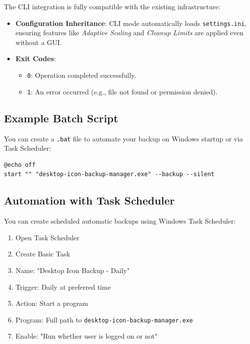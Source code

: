 \documentclass[a4paper,11pt]{article}
\begin{document}
The CLI integration is fully compatible with the existing infrastructure:

\begin{itemize}
  \item \textbf{Configuration Inheritance}: CLI mode automatically
    loads \texttt{settings.ini}, ensuring features like
    \textit{Adaptive Scaling} and \textit{Cleanup Limits} are applied
    even without a GUI.
  \item \textbf{Exit Codes}:
    \begin{itemize}
      \item \texttt{0}: Operation completed successfully.
      \item \texttt{1}: An error occurred (e.g., file not found or
        permission denied).
    \end{itemize}
\end{itemize}

\subsection{Example Batch Script}

You can create a \texttt{.bat} file to automate your backup on
Windows startup or via Task Scheduler:

\begin{verbatim}
@echo off
start "" "desktop-icon-backup-manager.exe" --backup --silent
\end{verbatim}

\subsection{Automation with Task Scheduler}

You can create scheduled automatic backups using Windows Task Scheduler:

\begin{enumerate}
  \item Open Task Scheduler
  \item Create Basic Task
  \item Name: "Desktop Icon Backup - Daily"
  \item Trigger: Daily at preferred time
  \item Action: Start a program
  \item Program: Full path to \texttt{desktop-icon-backup-manager.exe}
  \item Enable: "Run whether user is logged on or not"
\end{enumerate}
\end{document}
